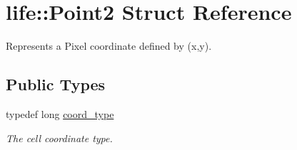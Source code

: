 \hypertarget{structlife_1_1_point2}{}\section{life\+::Point2 Struct Reference}
\label{structlife_1_1_point2}


Represents a Pixel coordinate defined by {\ttfamily (x,y)}.  


\subsection*{Public Types}
\begin{DoxyCompactItemize}
\item 
typedef long \mbox{\hyperlink{structlife_1_1_point2_abc66c92a3ad99b7fb9d8c179213edf58}{coord\+\_\+type}}
\begin{DoxyCompactList}\small\item\em The cell coordinate type. \end{DoxyCompactList}\end{DoxyCompactItemize}
